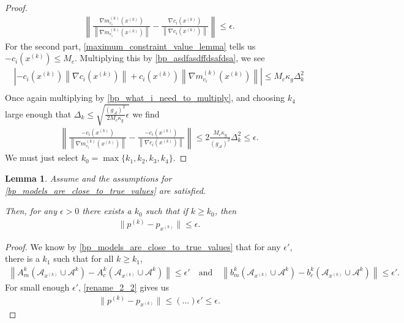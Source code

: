\documentclass{article}
\newtheorem{lemma}[theorem]{Lemma}
\theoremstyle{case}
\numberwithin{theorem}{subsection}
\newcommand{\dk}{\Delta_k}
\newcommand{\gmcik}{{\nabla m_{c_i}^{(k)}\left(\xk\right)}}
\newcommand{\minactivegrad}{{ g_{\mathcal A} }}
\newcommand{\xk}{{x^{(k)}}}
\begin{document}
\begin{proof}
\begin{align*}
\left\|\frac{\gmcik}{\left\|\gmcik\right\|} - \frac{\nabla c_i\left(\xk\right)}{\left\|\nabla c_i\left(\xk \right)\right\|} \right\| \le \epsilon.
\end{align*}
For the second part, 
\cref{maximum_constraint_value_lemma} tells us
$-c_i\left(\xk\right) \le M_c$.
Multiplying this by \cref{bp_asdfasdffdsafdsa}, we see
\begin{align*}
\left|-c_i\left(\xk\right)\left\|\nabla c_i\left(\xk \right)\right\| + c_i\left(\xk\right)\left\|\gmcik\right\|\right| \le M_c \kappa_g \dk^2 \\
\end{align*}
Once again multiplying by \cref{bp_what_i_need_to_multiply}, and choosing $k_4$ large enough that 
$\dk \le \sqrt{\frac{\left(\minactivegrad\right)^2}{2M_c \kappa_g} \epsilon}$
we find
\begin{align*}
\left\|\frac{-c_i\left(\xk \right)}{\left\|\gmcik\right\|} - \frac{-c_i\left(\xk \right)}{\left\|\nabla c_i\left(\xk \right)\right\|} \right\|
\le 2\frac{M_c \kappa_g}{\left(\minactivegrad\right)^2} \dk^2
\le \epsilon.
\end{align*}
We must just select $k_0 = \max\{k_1, k_2, k_3, k_4\}$.
\end{proof}


\begin{lemma}
\label{bp_first_application_of_2_2}
Assume 
and the assumptions for
\cref{bp_models_are_close_to_true_values}
are satisfied.

Then, for any $\epsilon > 0$ there exists a $k_0$ such that if $k \ge k_0$, then
\begin{align*}
\| p^{(k)} - p_{\xk} \| \le \epsilon.
\end{align*}
\end{lemma}
\begin{proof}
We know by \cref{bp_models_are_close_to_true_values} that for any $\epsilon'$, there is a $k_1$ such that for all $k \ge k_1$,
\begin{align*}
\left\|A^k_m\left(\mathcal A_{\xk} \cup \mathcal A^{k}\right) - A^k_c\left(\mathcal A_{\xk} \cup \mathcal A^{k}\right)\right\| \le \epsilon'
\quad \textrm{and} \quad \left\|b^k_m\left(\mathcal A_{\xk} \cup \mathcal A^{k}\right) - b^k_c\left(\mathcal A_{\xk} \cup \mathcal A^{k}\right)\right\| \le \epsilon'.
\end{align*}
For small enough $\epsilon'$, \cref{rename_2_2} gives us
\begin{align*}
\| p^{(k)} - p_{\xk} \| \le \left(\ldots\right) \epsilon' \le \epsilon.
\end{align*}
\end{proof}
\end{document}
